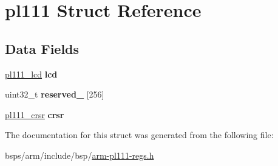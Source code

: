 \hypertarget{structpl111}{}\section{pl111 Struct Reference}
\label{structpl111}
\subsection*{Data Fields}
\begin{DoxyCompactItemize}
\item 
\mbox{\label{structpl111_aba65fda3433ca96007a48ec414e4a764}} 
\mbox{\hyperlink{structpl111__lcd}{pl111\+\_\+lcd}} {\bfseries lcd}
\item 
\mbox{\label{structpl111_a5bec9298f51fd8adb38500104135d6a2}} 
uint32\+\_\+t {\bfseries reserved\+\_} \mbox{[}256\mbox{]}
\item 
\mbox{\label{structpl111_af267a24746c531e292ed8091abf377d2}} 
\mbox{\hyperlink{structpl111__crsr}{pl111\+\_\+crsr}} {\bfseries crsr}
\end{DoxyCompactItemize}


The documentation for this struct was generated from the following file\+:\begin{DoxyCompactItemize}
\item 
bsps/arm/include/bsp/\mbox{\hyperlink{arm-pl111-regs_8h}{arm-\/pl111-\/regs.\+h}}\end{DoxyCompactItemize}
